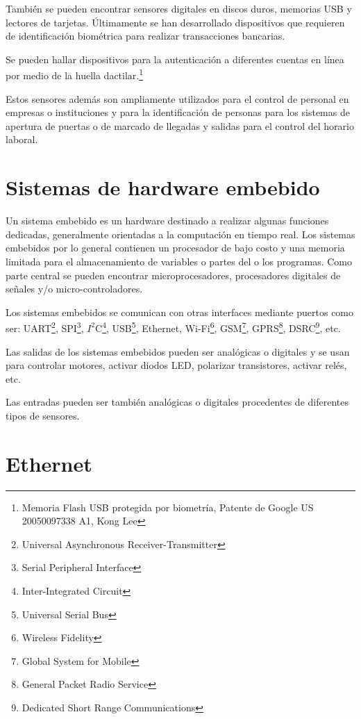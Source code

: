 \documentclass[../principal]{subfiles}
\begin{document}
  También se pueden encontrar sensores digitales en discos duros, memorias USB y lectores de tarjetas. Últimamente se han desarrollado dispositivos que requieren de identificación biométrica para realizar transacciones bancarias.

  Se pueden hallar dispositivos para la autenticación a diferentes cuentas en línea por medio de la huella dactilar.\href{http://www.google.com/patents/US20050097338}{\footnote{Memoria Flash USB protegida por biometría, Patente de Google US 20050097338 A1, Kong Lee}}

  Estos sensores además son ampliamente utilizados para el control de personal en empresas o instituciones y para la identificación de personas para los sistemas de apertura de puertas o de marcado de llegadas y salidas para el control del horario laboral.

  \section{Sistemas de hardware embebido}

  Un sistema embebido es un hardware destinado a realizar algunas funciones dedicadas, generalmente orientadas a la computación en tiempo real. Los sistemas embebidos por lo general contienen un procesador de bajo costo y una memoria limitada para el almacenamiento de variables o partes del o los programas. Como parte central se pueden encontrar microprocesadores, procesadores digitales de señales y/o micro-controladores.

  Los sistemas embebidos se comunican con otras interfaces mediante puertos como ser: UART\footnote{Universal Asynchronous Receiver-Transmitter}, SPI\footnote{Serial Peripheral Interface}, $ I^2 $C\footnote{Inter-Integrated Circuit}, USB\footnote{Universal Serial Bus}, Ethernet, Wi-Fi\footnote{Wireless Fidelity}, GSM\footnote{Global System for Mobile}, GPRS\footnote{General Packet Radio Service}, DSRC\footnote{Dedicated Short Range Communications}, etc.

  Las salidas de los sistemas embebidos pueden ser analógicas o digitales y se usan para controlar motores, activar diodos LED, polarizar transistores, activar relés, etc.

  Las entradas pueden ser también analógicas o digitales procedentes de diferentes tipos de sensores. \cite{libro:embedded_system_design}

  \section{Ethernet}
\end{document}
